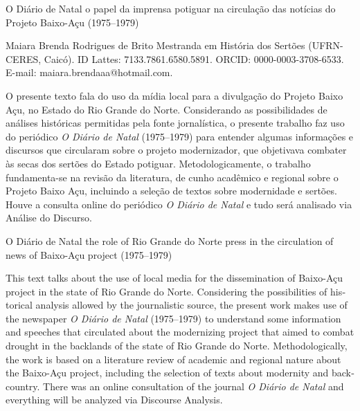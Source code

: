 \begin{refsection}
    \renewcommand{\thefigure}{\arabic{figure}}
    
    \chapterTwoLines
    {O Diário de Natal}
    {o papel da imprensa potiguar na circulação das notícias do Projeto Baixo-Açu (1975--1979)}
    \label{chap:diarionatal}
    
    \articleAuthor
    {Maiara Brenda Rodrigues de Brito}
    {Mestranda em História dos Sertões (UFRN-CERES, Caicó). ID Lattes: 7133.7861.6580.5891. ORCID: 0000-0003-3708-6533. E-mail: maiara.brendaaa@hotmail.com.}

    \begin{galoResumo}
        O presente texto fala do uso da mídia local para a divulgação do Projeto Baixo Açu, no Estado do Rio Grande do Norte. Considerando as possibilidades de análises históricas permitidas pela fonte jornalística, o presente trabalho faz uso do periódico \textit{O Diário de Natal} (1975--1979) para entender algumas informações e discursos que circularam sobre o projeto modernizador, que objetivava combater às secas dos sertões do Estado potiguar. Metodologicamente, o trabalho fundamenta-se na revisão da literatura, de cunho acadêmico e regional sobre o Projeto Baixo Açu, incluindo a seleção de textos sobre modernidade e sertões. Houve a consulta online do periódico \textit{O Diário de Natal} e tudo será analisado via Análise do Discurso.
    \end{galoResumo}
    
    
    \begin{otherlanguage}{english}
    
    \fakeChapterTwoLines
    {O Diário de Natal}
    {the role of Rio Grande do Norte press in the circulation of news of Baixo-Açu project (1975--1979)}

    \begin{galoResumo}[Abstract]
        This text talks about the use of local media for the dissemination of Baixo-Açu project in the state of Rio Grande do Norte. Considering the possibilities of historical analysis allowed by the journalistic source, the present work makes use of the newspaper \textit{O Diário de Natal} (1975--1979) to understand some information and speeches that circulated about the modernizing project that aimed to combat drought in the backlands of the state of Rio Grande do Norte. Methodologically, the work is based on a literature review of academic and regional nature about the Baixo-Açu project, including the selection of texts about modernity and backcountry. There was an online consultation of the journal \textit{O Diário de Natal} and everything will be analyzed via Discourse Analysis.
    \end{galoResumo}
    

\end{otherlanguage}
\end{refsection}
